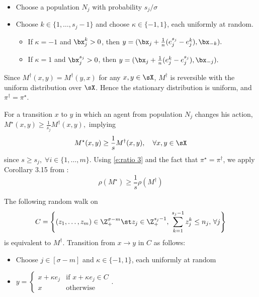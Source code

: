 \begin{itemize}
\item Choose a population $N_j$ with probability $s_j/\sigma$
\item Choose  $k\in \{1,\ldots,s_j-1\}$ and choose $\kappa\in \{-1,1\}$, each uniformly at random.
\begin{itemize}
\item If $\kappa = -1$ and $\bx_{j}^k>0$, then $y = (\bx_{j} + \frac{1}{n}(e_{j}^{s_j} - e_j^k),\bx_{{-k}}).$ 
\item If $\kappa = 1$ and $\bx_{j}^{s_j}>0$, then $y = (\bx_{j} + \frac{1}{n}(e_j^k - e_{j}^{s_j}),\bx_{{-j}}).$ 
\end{itemize}
\end{itemize}
Since $M^\dag(x,y) = M^\dag(y,x)$ for any $x,y\in  \sX$, $M^\dag$ is reversible with the uniform distribution over $ \sX$.  Hence the stationary distribution is uniform, and $\pi^\dag = \pi^\star$.

For a transition $x$ to $y$ in which an agent from population $N_j$ changes his action, $M^\star (x,y)\geq \frac{1}{s_j}M^\dag(x,y),$ implying 
\begin{equation}\label{e:ratio 3}
M^\star(x,y)\geq \frac{1}{s}M^\dag(x,y),\quad \forall x,y \in  \sX
\end{equation}
since $s\geq s_j,\;\forall i\in \{1,\ldots,m\}$.  Using \eqref{e:ratio 3} and the fact that $\pi^\star = \pi^\dag$, we apply Corollary 3.15 from \cite{Montenegro2006}:%
\begin{equation}\label{Sob const ineq 2}\rho(M^\star)\geq \frac{1}{s}\rho(M^\dag)\end{equation}


\noindent{}\label{s:random walk}
The following random walk on 
\small
$$C = \left\{(z_1,\ldots,z_m)\in \Z_+^{\sigma-m}\st z_j\in \Z_+^{s_j-1},\;\sum_{k=1}^{s_j-1} z_{j}^k \leq n_j,\, \forall j\right\}$$
\normalsize
is equivalent to $M^\dag$.  
Transition from $x\to y$ in $C$ as follows:
\begin{itemize}
\item Choose $j\in [\sigma-m]$ and $\kappa\in\{-1,1\}$, each uniformly at random
\item $y = \left\{\begin{array}{ll}x + \kappa e_j & \text{if } x+\kappa e_j \in C\\
							x&\text{otherwise}\end{array}\right.$.
\end{itemize}

